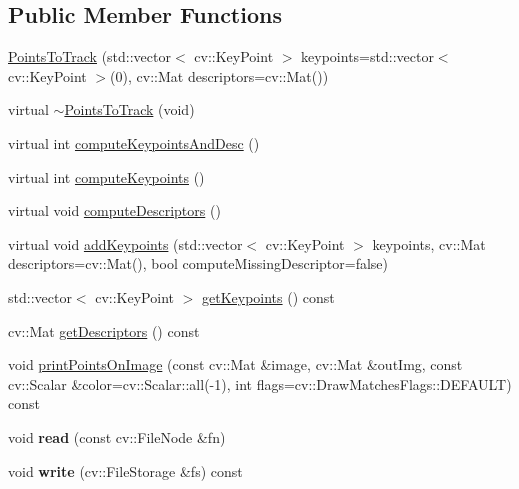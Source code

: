 \subsection*{Public Member Functions}
\begin{DoxyCompactItemize}
\item 
\hyperlink{class_opencv_sf_m_1_1_points_to_track_a0974269063e5a7708e1b992480666f87}{PointsToTrack} (std::vector$<$ cv::KeyPoint $>$ keypoints=std::vector$<$ cv::KeyPoint $>$(0), cv::Mat descriptors=cv::Mat())
\item 
virtual \hyperlink{class_opencv_sf_m_1_1_points_to_track_a530e94d0c39358538d907e977263cae0}{$\sim$PointsToTrack} (void)
\item 
virtual int \hyperlink{class_opencv_sf_m_1_1_points_to_track_ab672d2d9b350500dde92f0d39c8c2a98}{computeKeypointsAndDesc} ()
\item 
virtual int \hyperlink{class_opencv_sf_m_1_1_points_to_track_ac7009164560dac1f4d3283c4bf1181a3}{computeKeypoints} ()
\item 
virtual void \hyperlink{class_opencv_sf_m_1_1_points_to_track_a1e5ef9b8da87d1b412c348ad813d0267}{computeDescriptors} ()
\item 
virtual void \hyperlink{class_opencv_sf_m_1_1_points_to_track_a6ac0b2e69bb0fa51af529ec395fd0df7}{addKeypoints} (std::vector$<$ cv::KeyPoint $>$ keypoints, cv::Mat descriptors=cv::Mat(), bool computeMissingDescriptor=false)
\item 
std::vector$<$ cv::KeyPoint $>$ \hyperlink{class_opencv_sf_m_1_1_points_to_track_ab646203ef4a8955b9540ffc5b78943d4}{getKeypoints} () const 
\item 
cv::Mat \hyperlink{class_opencv_sf_m_1_1_points_to_track_a4ca955b907dee279030559d255a4e151}{getDescriptors} () const 
\item 
void \hyperlink{class_opencv_sf_m_1_1_points_to_track_adda3cb43ad421e89b8ddfe24f1c30b30}{printPointsOnImage} (const cv::Mat \&image, cv::Mat \&outImg, const cv::Scalar \&color=cv::Scalar::all(-\/1), int flags=cv::DrawMatchesFlags::DEFAULT) const 
\item 
\hypertarget{class_opencv_sf_m_1_1_points_to_track_a2a3e9cb24add788e7c4970d248d789ba}{
void {\bfseries read} (const cv::FileNode \&fn)}
\label{class_opencv_sf_m_1_1_points_to_track_a2a3e9cb24add788e7c4970d248d789ba}

\item 
\hypertarget{class_opencv_sf_m_1_1_points_to_track_a4313423bb8db1700a7639fbfddb173b5}{
void {\bfseries write} (cv::FileStorage \&fs) const }
\label{class_opencv_sf_m_1_1_points_to_track_a4313423bb8db1700a7639fbfddb173b5}

\end{DoxyCompactItemize}
